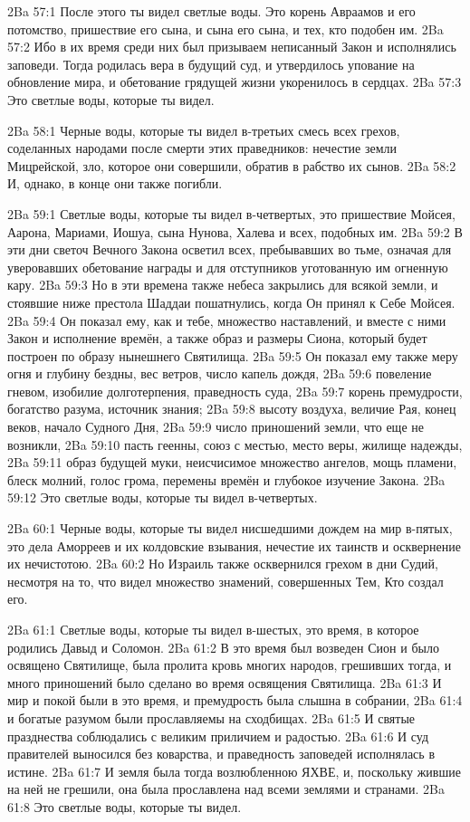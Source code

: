 \vs 2Ba 57:1
После этого ты видел светлые воды. Это корень Авраамов и его потомство, пришествие его сына, и сына его сына, и тех, кто подобен им.
\vs 2Ba 57:2
Ибо в их время среди них был призываем неписанный Закон и исполнялись заповеди. Тогда родилась вера в будущий суд, и утвердилось упование на обновление мира, и обетование грядущей жизни укоренилось в сердцах.
\vs 2Ba 57:3
Это светлые воды, которые ты видел.

\vs 2Ba 58:1
Черные воды, которые ты видел в-третьих смесь всех грехов, соделанных народами после смерти этих праведников: нечестие земли Мицрейской, зло, которое они совершили, обратив в рабство их сынов.
\vs 2Ba 58:2
И, однако, в конце они также погибли.

\vs 2Ba 59:1
Светлые воды, которые ты видел в-четвертых, это пришествие Мойсея, Аарона, Мариами, Иошуа, сына Нунова, Халева и всех, подобных им.
\vs 2Ba 59:2
В эти дни светоч Вечного Закона осветил всех, пребывавших во тьме, означая для уверовавших обетование награды и для отступников уготованную им огненную кару.
\vs 2Ba 59:3
Но в эти времена также небеса закрылись для всякой земли, и стоявшие ниже престола Шаддаи пошатнулись, когда Он принял к Себе Мойсея.
\vs 2Ba 59:4
Он показал ему, как и тебе, множество наставлений, и вместе с ними Закон и исполнение времён, а также образ и размеры Сиона, который будет построен по образу нынешнего Святилища.
\vs 2Ba 59:5
Он показал ему также меру огня и глубину бездны, вес ветров, число капель дождя,
\vs 2Ba 59:6
повеление гневом, изобилие долготерпения, праведность суда,
\vs 2Ba 59:7
корень премудрости, богатство разума, источник знания;
\vs 2Ba 59:8
высоту воздуха, величие Рая, конец веков, начало Судного Дня,
\vs 2Ba 59:9
число приношений земли, что еще не возникли,
\vs 2Ba 59:10
пасть геенны, союз с местью, место веры, жилище надежды,
\vs 2Ba 59:11
образ будущей муки, неисчисимое множество ангелов, мощь пламени, блеск молний, голос грома, перемены времён и глубокое изучение Закона.
\vs 2Ba 59:12
Это светлые воды, которые ты видел в-четвертых.

\vs 2Ba 60:1
Черные воды, которые ты видел нисшедшими дождем на мир в-пятых, это дела Аморреев и их колдовские взывания, нечестие их таинств и осквернение их нечистотою.
\vs 2Ba 60:2
Но Израиль также осквернился грехом в дни Судий, несмотря на то, что видел множество знамений, совершенных Тем, Кто создал его.

\vs 2Ba 61:1
Светлые воды, которые ты видел в-шестых, это время, в которое родились Давыд и Соломон.
\vs 2Ba 61:2
В это время был возведен Сион и было освящено Святилище, была пролита кровь многих народов, грешивших тогда, и много приношений было сделано во время освящения Святилища.
\vs 2Ba 61:3
И мир и покой были в это время, и премудрость была слышна в собрании,
\vs 2Ba 61:4
и богатые разумом были прославляемы на сходбищах.
\vs 2Ba 61:5
И святые празднества соблюдались с великим приличием и радостью.
\vs 2Ba 61:6
И суд правителей выносился без коварства, и праведность заповедей исполнялась в истине.
\vs 2Ba 61:7
И земля была тогда возлюбленною ЯХВЕ, и, поскольку жившие на ней не грешили, она была прославлена над всеми землями и странами.
\vs 2Ba 61:8
Это светлые воды, которые ты видел.

